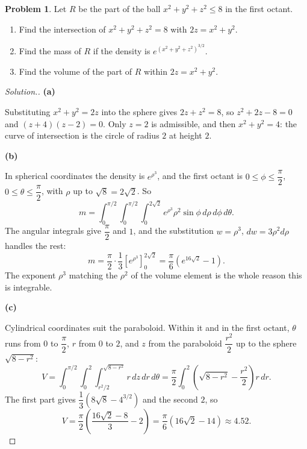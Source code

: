 \documentclass[11pt,a4paper]{article}
\theoremstyle{definition}
\newtheorem{problemx}{Problem}[subsection]
\newenvironment{problem}{\begin{problemx}}{\end{problemx}}
\newenvironment{solution}
  {\renewcommand{\qedsymbol}{}\begin{proof}[\textit{Solution}.]}
  {\end{proof}}
\newcommand{\subhead}[1]{%
  \par\medskip\noindent\textbf{#1}\par\nobreak\smallskip}
\begin{document}
\begin{problem}
Let $R$ be the part of the ball $x^2+y^2+z^2\leq 8$ in the first octant.
\begin{enumerate}
\item[(a)] Find the intersection of $x^2+y^2+z^2 = 8$ with $2z = x^2+y^2$.
\item[(b)] Find the mass of $R$ if the density is
$e^{(x^2+y^2+z^2)^{3/2}}$.
\item[(c)] Find the volume of the part of $R$ within $2z = x^2+y^2$.
\end{enumerate}
\end{problem}
\begin{solution}
\subhead{(a)}
Substituting $x^2+y^2 = 2z$ into the sphere gives $2z+z^2 = 8$, so
$z^2+2z-8 = 0$ and $(z+4)(z-2) = 0$. Only $z=2$ is admissible, and then
$x^2+y^2 = 4$: the curve of intersection is the circle of radius $2$ at height
$2$.

\subhead{(b)}
In spherical coordinates the density is $e^{\rho^3}$, and the first octant is
$0\leq\phi\leq\dfrac{\pi}{2}$, $0\leq\theta\leq\dfrac{\pi}{2}$, with
$\rho$ up to $\sqrt8 = 2\sqrt2$. So
\[m = \int_0^{\pi/2}\int_0^{\pi/2}\int_0^{2\sqrt2}
e^{\rho^3}\rho^2\sin\phi\,d\rho\,d\phi\,d\theta .\]
The angular integrals give $\dfrac{\pi}{2}$ and $1$, and the substitution
$w = \rho^3$, $dw = 3\rho^2d\rho$ handles the rest:
\[m = \frac{\pi}{2}\cdot\frac13[e^{\rho^3}]_0^{2\sqrt2}
= \frac{\pi}{6}(e^{16\sqrt2}-1).\]
The exponent $\rho^3$ matching the $\rho^2$ of the volume element is the whole
reason this is integrable.

\subhead{(c)}
Cylindrical coordinates suit the paraboloid. Within it and in the first octant,
$\theta$ runs from $0$ to $\dfrac{\pi}{2}$, $r$ from $0$ to $2$, and $z$ from
the paraboloid $\dfrac{r^2}{2}$ up to the sphere $\sqrt{8-r^2}$:
\[V = \int_0^{\pi/2}\int_0^2\int_{r^2/2}^{\sqrt{8-r^2}}r\,dz\,dr\,d\theta
= \frac{\pi}{2}\int_0^2\left(\sqrt{8-r^2}-\frac{r^2}{2}\right)r\,dr .\]
The first part gives $\dfrac13(8\sqrt8 - 4^{3/2})$ and the second
$2$, so
\[V = \frac{\pi}{2}\left(\frac{16\sqrt2-8}{3} - 2\right)
= \frac{\pi}{6}(16\sqrt2 - 14)\approx 4.52 .\]
\end{solution}
\end{document}
